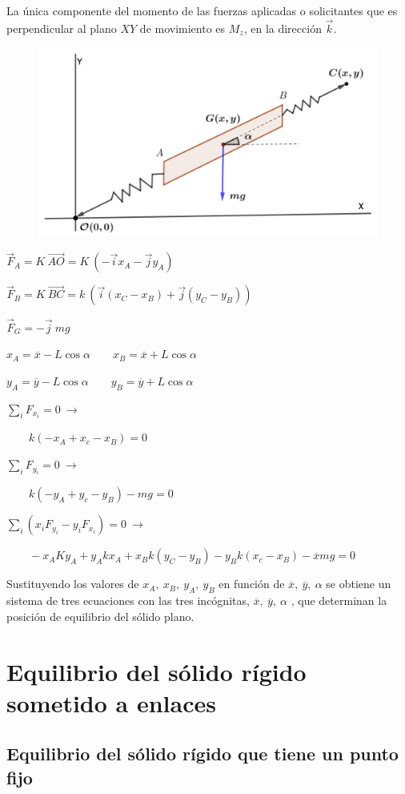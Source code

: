  La única componente del momento de las fuerzas aplicadas o solicitantes que es perpendicular al plano $XY$ de movimiento es $M_z$, en la dirección $\vec k$.
 
 \begin{figure}[H]
	\centering
	\includegraphics[width=.7\textwidth]{imagenes/imagenes06/T06IM05.png}
\end{figure}
 
 
 $\vec F_A=K\ \overrightarrow{AO}=K\ (-\vec i x_A-\vec j y_A)$
 
 $\vec F_B=K\ \overrightarrow{BC}=k\ (\vec i (x_C-x_B)+\vec j (y_C-y_B))$
 
 $\vec F_G=-\vec j\ mg$
 
 $x_A=\overline x-L\cos \alpha \qquad x_B=\overline x+L\cos \alpha$
 
  $y_A=\overline y-L\cos \alpha \qquad y_B=\overline y+L\cos \alpha$
 
  
$ \sum_i F_{x_i}=0 \ \to$ 
 
$\qquad k(-x_A+x_c-x_B)=0 $ 
    
$\sum_i F_{y_i}=0 \ \to$
 
$\qquad k(-y_A+y_c-y_B)-mg=0$
  
$ \sum_i(x_iF_{y_i}-y_iF_{x_i})=0 \ \to$

$\qquad  -x_AKy_A+y_Akx_A+x_Bk(y_C-y_B)-y_Bk(x_c-x_B)-\overline x mg=0 $
  
 Sustituyendo los valores de $x_A,\ x_B,\ y_A,\ y_B$ en función de $\overline x,\ \overline y,\ \alpha$ se obtiene un sistema de tres ecuaciones con las tres incógnitas, $\overline x,\ \overline y,\ \alpha$ , que determinan la posición de equilibrio del sólido plano.
 
 \section{Equilibrio del sólido rígido sometido a enlaces}
 \subsection{Equilibrio del sólido rígido que tiene un punto fijo}


